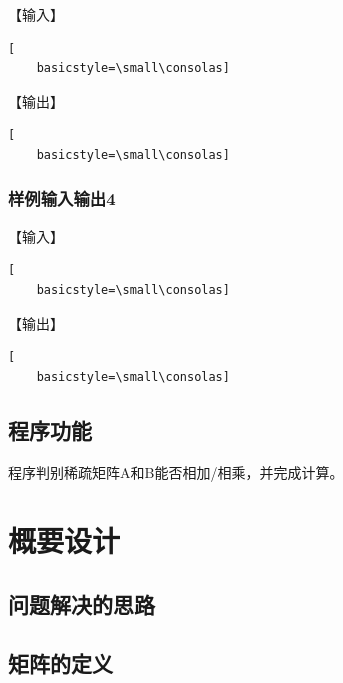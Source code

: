 \documentclass{article}
\begin{document}
【输入】

\begin{lstlisting}[
    basicstyle=\small\consolas]

\end{lstlisting}

【输出】

\begin{lstlisting}[
    basicstyle=\small\consolas]

\end{lstlisting}

\subsubsection{样例输入输出4}

【输入】

\begin{lstlisting}[
    basicstyle=\small\consolas]

\end{lstlisting}

【输出】

\begin{lstlisting}[
    basicstyle=\small\consolas]

\end{lstlisting}

\subsection{程序功能}

程序判别稀疏矩阵A和B能否相加/相乘，并完成计算。

\section{概要设计}

\subsection{问题解决的思路}

%

\subsection{矩阵的定义}
\end{document}
